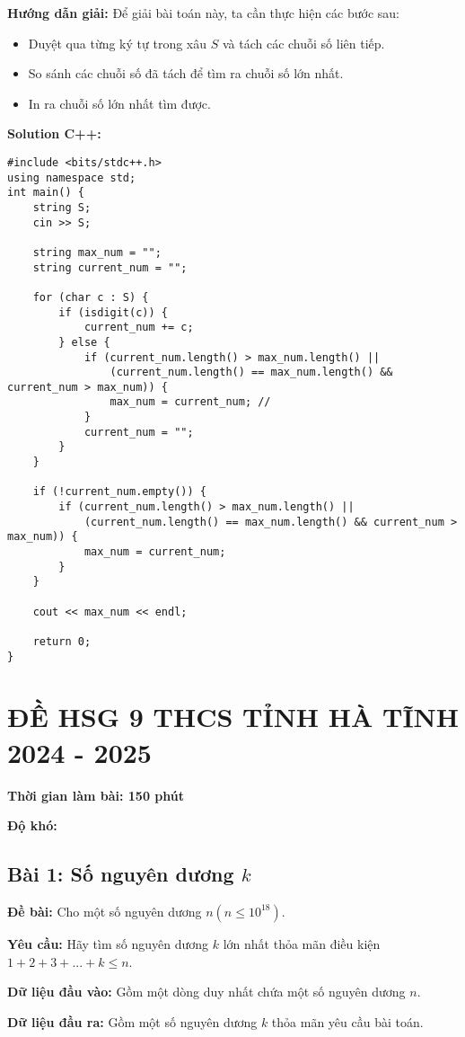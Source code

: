 \documentclass[12pt]{scrartcl}  %
\begin{document}
\textbf{Hướng dẫn giải:}
Để giải bài toán này, ta cần thực hiện các bước sau:
\begin{itemize}
    \item Duyệt qua từng ký tự trong xâu $S$ và tách các chuỗi số liên tiếp.
    \item So sánh các chuỗi số đã tách để tìm ra chuỗi số lớn nhất.
    \item In ra chuỗi số lớn nhất tìm được.
\end{itemize}
\textbf{Solution C++:}
\begin{lstlisting}
#include <bits/stdc++.h>
using namespace std;
int main() {
    string S;
    cin >> S;

    string max_num = "";
    string current_num = "";

    for (char c : S) {
        if (isdigit(c)) {
            current_num += c; 
        } else {
            if (current_num.length() > max_num.length() || 
                (current_num.length() == max_num.length() && current_num > max_num)) {
                max_num = current_num; // 
            }
            current_num = ""; 
        }
    }

    if (!current_num.empty()) {
        if (current_num.length() > max_num.length() || 
            (current_num.length() == max_num.length() && current_num > max_num)) {
            max_num = current_num;
        }
    }

    cout << max_num << endl;

    return 0;
}
\end{lstlisting}

\section{ĐỀ HSG 9 THCS TỈNH HÀ TĨNH 2024 - 2025}

\textbf{Thời gian làm bài: 150 phút}

\textbf{Độ khó: }
\subsection{Bài 1: Số nguyên dương $k$}

\textbf{Đề bài:}
Cho một số nguyên dương $n (n \leq 10^{18})$. 

\textbf{Yêu cầu:}
Hãy tìm số nguyên dương $k$ lớn nhất thỏa mãn điều kiện $1 + 2 + 3 + ... + k \leq n$. 

\textbf{Dữ liệu đầu vào:}
Gồm một dòng duy nhất chứa một số nguyên dương $n$. 

\textbf{Dữ liệu đầu ra:}
Gồm một số nguyên dương $k$ thỏa mãn yêu cầu bài toán.
\end{document}
